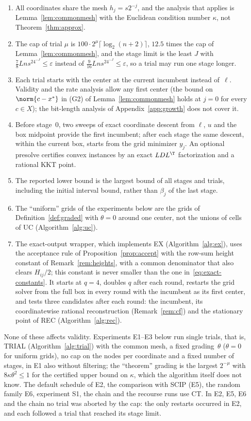 \begin{enumerate}[label=(\alph*)]
\item All coordinates share the mesh $h_j=s2^{-j}$, and the analysis that
applies is Lemma~\ref{lem:commonmesh} with the Euclidean condition number
$\kappa$, not Theorem~\ref{thm:approx}.
\item The cap of trial $\mu$ is $100\cdot2^\mu\lceil\log_2(n+2)\rceil$,
$12.5$ times the cap of Lemma~\ref{lem:commonmesh}, and the stage limit is the
least $J$ with $\frac78Lns^24^{-J}\le\varepsilon$ instead of
$\frac9{16}Lns^24^{-J}\le\varepsilon$, so a trial may run one stage longer.
\item Each trial starts with the center at the current incumbent instead
of~$\ell$. Validity and the rate analysis allow any first center (the bound
on $\norm{c-x^*}$ in (G2) of Lemma~\ref{lem:commonmesh} holds at $j=0$ for
every $c\in X$); the bit-length analysis of Appendix~\ref{app:growth} does
not cover it.
\item Before stage~$0$, two sweeps of exact coordinate descent from $\ell$,
$u$ and the box midpoint provide the first incumbent; after each stage the
same descent, within the current box, starts from the grid minimizer $y_j$.
An optional presolve certifies convex instances by an exact $LDL^\T$ factorization and a rational
KKT point.
\item The reported lower bound is the largest bound of all stages and trials,
including the initial interval bound, rather than $\beta_j$ of the last
stage.
\item The ``uniform'' grids of the experiments below are the grids of
Definition~\ref{def:graded} with $\theta=0$ around one center, not the unions
of cells of UC (Algorithm~\ref{alg:uc}).
\item The exact-output wrapper, which implements EX (Algorithm~\ref{alg:ex}),
uses the acceptance rule of Proposition~\ref{prop:accept} with the row-sum
height constant of Remark~\ref{rem:heights}, with a common denominator that
also clears $H_{ij}/2$; this constant is never smaller than the one
in~\eqref{eq:exact-constants}. It starts at $q=4$, doubles $q$ after each
round, restarts the grid solver from the full box in every round with the
incumbent as its first center, and tests three candidates after each round:
the incumbent, its coordinatewise rational reconstruction
(Remark~\ref{rem:cf}) and the stationary point of REC
(Algorithm~\ref{alg:rec}).
\end{enumerate}
None of these affects validity. Experiments E1--E3 below run single trials,
that is, TRIAL (Algorithm~\ref{alg:trial}) with the common mesh, a fixed
grading~$\theta$ ($\theta=0$ for uniform grids), no cap on the nodes per
coordinate and a fixed number of stages, in E1 also without filtering; the
``theorem'' grading is the largest $2^{-\mu}$ with $8\kappa\theta^2\le1$ for the certified upper bound on
$\kappa$, which the algorithm itself does not know. The default schedule of
E2, the comparison with SCIP (E5), the random family E6, experiment S1, the
chain and the recourse runs use CT. In E2, E5, E6 and the chain no trial was
aborted by the cap: the only restarts occurred in E2, and each followed a
trial that reached its stage limit.

